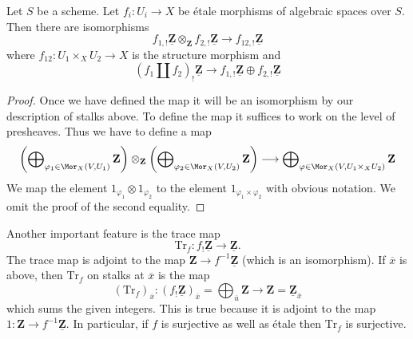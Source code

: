 \begin{lemma}
\label{lemma-product-is-tensor-product}
Let $S$ be a scheme. Let $f_i : U_i \to X$ be \'etale morphisms
of algebraic spaces over $S$. Then there are isomorphisms
$$
f_{1, !}\underline{\mathbf{Z}} \otimes_{\mathbf{Z}}
f_{2, !}\underline{\mathbf{Z}}
\longrightarrow
f_{12, !}\underline{\mathbf{Z}}
$$
where $f_{12} : U_1 \times_X U_2 \to X$ is the structure morphism
and
$$
(f_1 \amalg f_2)_! \underline{\mathbf{Z}}
\longrightarrow
f_{1, !}\underline{\mathbf{Z}} \oplus
f_{2, !}\underline{\mathbf{Z}}
$$
\end{lemma}

\begin{proof}
Once we have defined the map it will be an isomorphism by our description
of stalks above. To define the map it suffices to work on the level of
presheaves. Thus we have to define a map
$$
\left(\bigoplus\nolimits_{\varphi_1 \in \Mor_X(V, U_1)} \mathbf{Z}\right)
\otimes_{\mathbf{Z}}
\left(\bigoplus\nolimits_{\varphi_2 \in \Mor_X(V, U_2)} \mathbf{Z}\right)
\longrightarrow
\bigoplus\nolimits_{\varphi \in \Mor_X(V, U_1 \times_X U_2)}
\mathbf{Z}
$$
We map the element $1_{\varphi_1} \otimes 1_{\varphi_2}$ to the element
$1_{\varphi_1 \times \varphi_2}$ with obvious notation. We omit the proof
of the second equality.
\end{proof}

\noindent
Another important feature is the trace map
$$
\text{Tr}_f : f_!\underline{\mathbf{Z}} \longrightarrow \underline{\mathbf{Z}}.
$$
The trace map is adjoint to the
map $\mathbf{Z} \to f^{-1}\underline{\mathbf{Z}}$ (which is an isomorphism).
If $\overline{x}$ is above, then $\text{Tr}_f$ on stalks at $\overline{x}$
is the map
$$
(\text{Tr}_f)_{\overline{x}} :
(f_!\underline{\mathbf{Z}})_{\overline{x}} =
\bigoplus\nolimits_{\overline{u}} \mathbf{Z}
\longrightarrow
\mathbf{Z} = \underline{\mathbf{Z}}_{\overline{x}}
$$
which sums the given integers. This is true because it is adjoint to the map
$1 : \mathbf{Z} \to f^{-1}\underline{\mathbf{Z}}$. In particular, if
$f$ is surjective as well as \'etale then $\text{Tr}_f$ is surjective.

